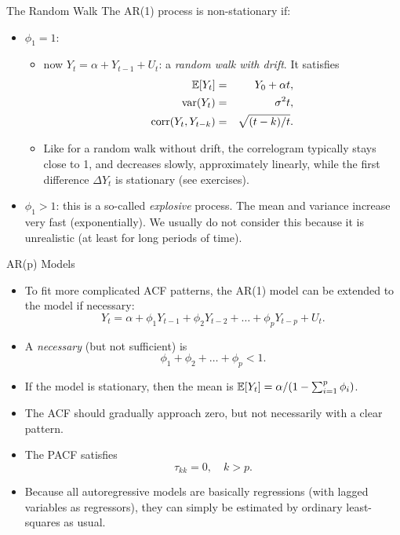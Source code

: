 \begin{frame}{The Random Walk}
The AR(1) process is non-stationary if:
\begin{itemize}
\item $\phi_1 =1$:
\begin{itemize}

 \item now $Y_t=\alpha +Y_{t-1}+ U_t$: a \emph{%
\color{red} random walk with drift}. It satisfies
\begin{eqnarray*}
{\mathbb E}[Y_t]&=&Y_0+\alpha t, \\
\mathrm{var}(Y_t)&=&\sigma ^2t, \\
\mathrm{corr}(Y_t,Y_{t-k})&=&\sqrt{(t-k)/t}.
\end{eqnarray*}
\item Like for a random walk without drift, the correlogram typically stays close to 1, and decreases slowly,
approximately linearly, while the first difference $\Delta Y_t$ is stationary (see exercises).
\end{itemize}
\item $\phi_1 >1$: this is a so-called \emph{\color{red}explosive} process.
The mean and variance increase very fast (exponentially). We usually do not
consider this because it is unrealistic (at least for long periods of time).
\end{itemize}

\end{frame}
\begin{frame}{AR(p) Models}
\begin{itemize}
\item To fit more complicated ACF patterns, the AR(1) model can be extended to the  model if necessary:
\begin{equation*}
Y_t=\alpha +\phi _1Y_{t-1}+\phi _2Y_{t-2}+\ldots +\phi _pY_{t-p}+ U_t.
\end{equation*}
\item A \emph{necessary} (but not sufficient)  is
\begin{equation*}
\phi _1+\phi _2+\ldots +\phi _p<1 .
\end{equation*}
\item If the model is stationary, then the mean is ${\mathbb E}[Y_t] = \alpha/(1-\sum_{i=1}^p \phi_i)$.
\item The ACF should gradually approach zero, but not necessarily with a
clear pattern.
\item The PACF satisfies
\begin{equation*}
\tau _{kk}=0,\quad k>p.
\end{equation*}

\item Because all autoregressive models are basically regressions (with lagged
variables as regressors), they can simply be estimated by ordinary
least-squares as usual.
\end{itemize}
\end{frame}

